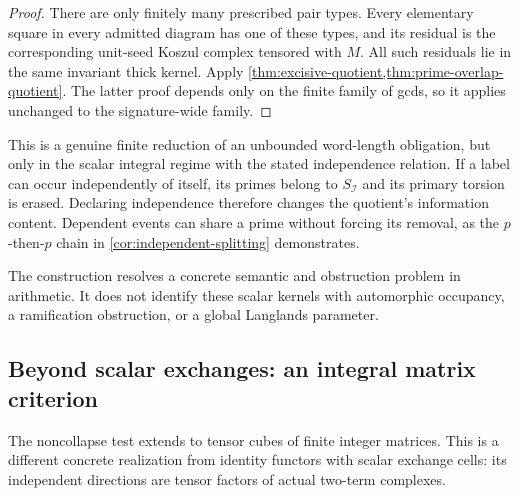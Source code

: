 \begin{proof}
There are only finitely many prescribed pair types. Every elementary square in every admitted diagram has one of these types, and its residual is the corresponding unit-seed Koszul complex tensored with $M$. All such residuals lie in the same invariant thick kernel. Apply \cref{thm:excisive-quotient,thm:prime-overlap-quotient}. The latter proof depends only on the finite family of gcds, so it applies unchanged to the signature-wide family.
\end{proof}

This is a genuine finite reduction of an unbounded word-length obligation, but only in the scalar integral regime with the stated independence relation. If a label can occur independently of itself, its primes belong to $S_{\mathcal I}$ and its primary torsion is erased. Declaring independence therefore changes the quotient's information content. Dependent events can share a prime without forcing its removal, as the $p$-then-$p$ chain in \cref{cor:independent-splitting} demonstrates.

The construction resolves a concrete semantic and obstruction problem in arithmetic. It does not identify these scalar kernels with automorphic occupancy, a ramification obstruction, or a global Langlands parameter.

\subsection{Beyond scalar exchanges: an integral matrix criterion}

The noncollapse test extends to tensor cubes of finite integer matrices. This is a different concrete realization from identity functors with scalar exchange cells: its independent directions are tensor factors of actual two-term complexes.

